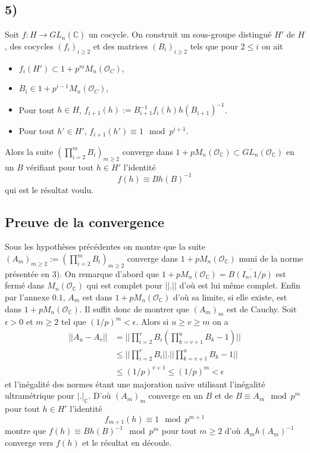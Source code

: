 \documentclass[a4paper,12pt]{article}
\newcommand{\C}{\mathbb{C}}
\newcommand{\Or}{\mathcal{O}}
\theoremstyle{plain}
\theoremstyle{definition}
\theoremstyle{remark}
\begin{document}
\subsection*{5)}
Soit $f\colon H\to GL_n(\C)$ un cocycle. On construit un 
sous-groupe distingué $H'$ de $H$, des
cocycles $(f_i)_{i\geq 2}$ et des matrices $(B_i)_{i\geq 2}$ tels
que pour $2\leq i$ on ait
\begin{itemize}
  \item $f_i(H')\subset 1+p^mM_n(\Or_C)$,
  \item $B_i\in 1+p^{i-1}M_n(\Or_C)$,
  \item Pour tout $h\in H$, $f_{i+1}(h):=B_{i+1}^{-1}f_i(h)h(B_{i+1})^{-1}$.
  \item Pour tout $h'\in H'$, $f_{i+1}(h')\equiv 1\mod p^{i+1}$.
\end{itemize}
Alors la suite $(\prod_{i=2}^m B_i)_{m\geq 2}$ converge dans 
$1+pM_n(\Or_\C)\subset GL_n(\Or_\C)$ en un $B$ vérifiant pour tout
$h\in H'$ l'identité
\[f(h)\equiv Bh(B)^{-1}\]
qui est le résultat voulu.

\subsection*{Preuve de la convergence}
Sous les hypothèses précédentes on montre que la suite 
$(A_m)_{m\geq 2}:=(\prod_{i=2}^mB_i)_{m\geq 2}$ converge dans
$1+pM_n(\Or_\C)$
muni de la norme présentée en 3). On remarque d'abord que 
$1+pM_n(\Or_\C)=\overline{B(I_n,1/p)}$ est fermé dans 
$M_n(\Or_\C)$ qui est complet pour $||.||$ d'où est lui même
complet. Enfin par l'annexe $0.1$, $A_m$ est dans 
$1+pM_n(\Or_\C)$ d'où sa limite, si elle existe, est dans 
$1+pM_n(\Or_\C)$. Il suffit donc de montrer que $(A_m)_m$ est de
Cauchy.
Soit $\epsilon>0$ et $m\geq 2$ tel que $(1/p)^m<\epsilon$. Alors
si $u\geq v\geq m$ on a 
\begin{align*}
||A_u-A_v||&=||\prod_{i=2}^vB_i(\prod_{k=v+1}^uB_k-1)||\\
	   &\leq ||\prod_{i=2}^vB_i||.||\prod_{k=v+1}^uB_k-1||\\
	   &\leq (1/p)^{v+1}\leq (1/p)^m<\epsilon
\end{align*}
et l'inégalité des normes étant une majoration naive utilisant
l'inégalité ultramétrique pour $|.|_\C$. D'où $(A_m)_m$ converge
en un $B$ et de $B\equiv A_m \mod p^m$ pour tout $h\in H'$
l'identité
\[f_{m+1}(h)\equiv 1\mod p^{m+1}\]
montre que $f(h)\equiv Bh(B)^{-1}\mod p^m$ pour tout $m\geq 2$
d'où $A_mh(A_m)^{-1}$ converge vers $f(h)$
et le résultat en découle.
\end{document}
